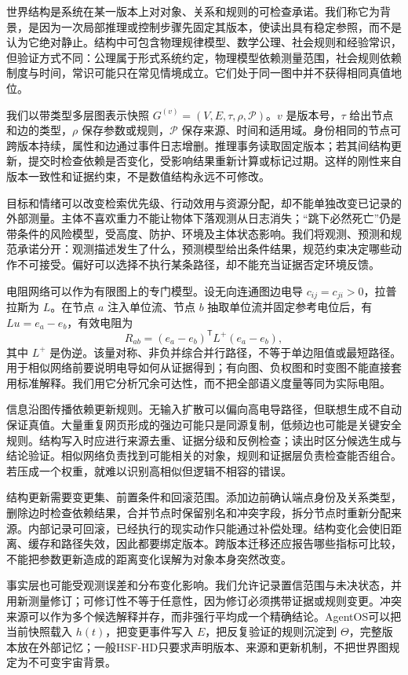 世界结构是系统在某一版本上对对象、关系和规则的可检查承诺。我们称它为背景，是因为一次局部推理或控制步骤先固定其版本，使读出具有稳定参照，而不是认为它绝对静止。结构中可包含物理规律模型、数学公理、社会规则和经验常识，但验证方式不同：公理属于形式系统约定，物理模型依赖测量范围，社会规则依赖制度与时间，常识可能只在常见情境成立。它们处于同一图中并不获得相同真值地位。

我们以带类型多层图表示快照 $G^{(v)}=(V,E,\tau,\rho,\mathcal P)$。$v$ 是版本号，$\tau$ 给出节点和边的类型，$\rho$ 保存参数或规则，$\mathcal P$ 保存来源、时间和适用域。身份相同的节点可跨版本持续，属性和边通过事件日志增删。推理事务读取固定版本；若其间结构更新，提交时检查依赖是否变化，受影响结果重新计算或标记过期。这样的刚性来自版本一致性和证据约束，不是数值结构永远不可修改。

目标和情绪可以改变检索优先级、行动效用与资源分配，却不能单独改变已记录的外部测量。主体不喜欢重力不能让物体下落观测从日志消失；“跳下必然死亡”仍是带条件的风险模型，受高度、防护、环境及主体状态影响。我们将观测、预测和规范承诺分开：观测描述发生了什么，预测模型给出条件结果，规范约束决定哪些动作不可接受。偏好可以选择不执行某条路径，却不能充当证据否定环境反馈。

电阻网络可以作为有限图上的专门模型。设无向连通图边电导 $c_{ij}=c_{ji}>0$，拉普拉斯为 $L$。在节点 $a$ 注入单位流、节点 $b$ 抽取单位流并固定参考电位后，有 $Lu=e_a-e_b$，有效电阻为
\[
R_{ab}=(e_a-e_b)^{\mathsf T}L^+(e_a-e_b),
\]
其中 $L^+$ 是伪逆。该量对称、非负并综合并行路径，不等于单边阻值或最短路径。用于相似网络前要说明电导如何从证据得到；有向图、负权图和时变图不能直接套用标准解释。我们用它分析冗余可达性，而不把全部语义度量等同为实际电阻。

信息沿图传播依赖更新规则。无输入扩散可以偏向高电导路径，但联想生成不自动保证真值。大量重复网页形成的强边可能只是同源复制，低频边也可能是关键安全规则。结构写入时应进行来源去重、证据分级和反例检查；读出时区分候选生成与结论验证。相似网络负责找到可能相关的对象，规则和证据层负责检查能否组合。若压成一个权重，就难以识别高相似但逻辑不相容的错误。

结构更新需要变更集、前置条件和回滚范围。添加边前确认端点身份及关系类型，删除边时检查依赖结果，合并节点时保留别名和冲突字段，拆分节点时重新分配来源。内部记录可回滚，已经执行的现实动作只能通过补偿处理。结构变化会使旧距离、缓存和路径失效，因此都要绑定版本。跨版本迁移还应报告哪些指标可比较，不能把参数更新造成的距离变化误解为对象本身突然改变。

事实层也可能受观测误差和分布变化影响。我们允许记录置信范围与未决状态，并用新测量修订；可修订性不等于任意性，因为修订必须携带证据或规则变更。冲突来源可以作为多个候选解释并存，而非强行平均成一个精确结论。AgentOS可以把当前快照载入 $h(t)$，把变更事件写入 $E$，把反复验证的规则沉淀到 $\Theta$，完整版本放在外部记忆；一般HSF-HD只要求声明版本、来源和更新机制，不把世界图规定为不可变宇宙背景。

